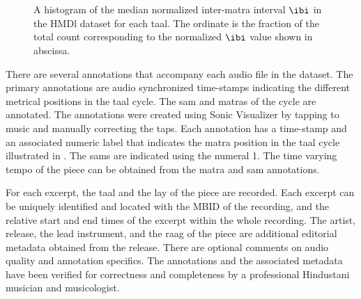 \begin{figure}[t]
\centering
{} \hspace{0.5cm} 
 \\ 
 \hspace{0.4cm} 
 \\ 
\caption[Histogram of median normalized $\protect\ibi$ in the \acrshort{HMDl} dataset]{A histogram of the median normalized inter-\gls{matra} interval $\protect\ibi$ in the \acrshort{HMDl} dataset for each \gls{taal}. The ordinate is the fraction of the total count corresponding to the normalized $\ibi$ value shown in abscissa.}\label{fig:dstats:HMDl:IAInorm}
\centering
\end{figure}
%

There are several annotations that accompany each audio file in the dataset. The primary annotations are audio synchronized time-stamps indicating the different metrical positions in the \gls{taal} cycle. The \gls{sam} and \glspl{matra} of the cycle are annotated. The annotations were created using Sonic Visualizer by tapping to music and manually correcting the taps. Each annotation has a time-stamp and an associated numeric label that indicates the \gls{matra} position in the \gls{taal} cycle illustrated in . The \glspl{sam} are indicated using the numeral 1. The time varying tempo of the piece can be obtained from the \gls{matra} and \gls{sam} annotations. 

For each excerpt, the \gls{taal} and the \gls{lay} of the piece are recorded. Each excerpt can be uniquely identified and located with the \gls{MBID} of the recording, and the relative start and end times of the excerpt within the whole recording. The artist, release, the lead instrument, and the \gls{raag} of the piece are additional editorial metadata obtained from the release. There are optional comments on audio quality and annotation specifics. The annotations and the associated metadata have been verified for correctness and completeness by a professional Hindustani musician and musicologist. 

